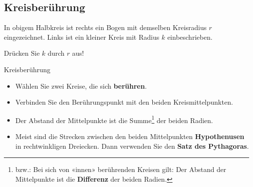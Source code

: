 \subsection{Kreisberührung}



In obigem Halbkreis ist rechts ein Bogen mit demselben Kreisradius $r$
eingezeichnet. Links ist ein kleiner Kreis mit Radius $k$
einbeschrieben.

Drücken Sie $k$ durch $r$ aus!
\newpage




\newpage


\begin{rezept}{Kreisberührung}{}
  \begin{itemize}

  \item Wählen Sie zwei Kreise, die sich \textbf{berühren}.

  \item Verbinden Sie den Berührungspunkt mit den beiden
    Kreismittelpunkten.

  \item Der Abstand der Mittelpunkte ist die Summe\footnote{bzw.: Bei
    sich von «innen» berührenden Kreisen gilt: Der Abstand der
    Mittelpunkte ist die \textbf{Differenz} der beiden Radien.} der beiden Radien.

  \item  Meist sind die Strecken zwischen den beiden Mittelpunkten
  \textbf{Hypothenusen} in rechtwinkligen Dreiecken. Dann verwenden Sie den
  \textbf{Satz des Pythagoras}.

    \end{itemize}
    
\end{rezept}


